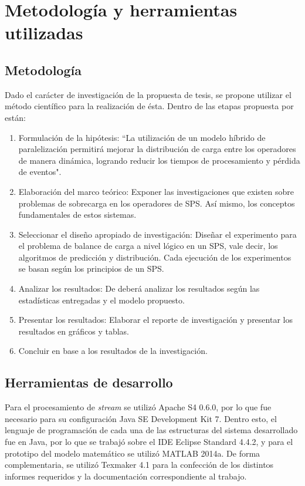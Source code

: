 \section{Metodología y herramientas utilizadas}
\label{intro:metodologia}

\subsection{Metodología}
Dado el carácter de investigación de la propuesta de tesis, se propone utilizar el método científico para la realización de ésta. Dentro de las etapas propuesta por \citep{hernandez2010metodologia} están:

\begin{enumerate}
	\item Formulación de la hipótesis: ``La utilización de un modelo híbrido de paralelización permitirá mejorar la distribución de carga entre los operadores de manera dinámica, logrando reducir los tiempos de procesamiento y pérdida de eventos".
	\item Elaboración del marco teórico: Exponer las investigaciones que existen sobre problemas de sobrecarga en los operadores de SPS. Así mismo, los conceptos fundamentales de estos sistemas.
	\item Seleccionar el diseño apropiado de investigación: Diseñar el experimento para el problema de balance de carga a nivel lógico en un SPS, vale decir, los algoritmos de predicción y distribución. Cada ejecución de los experimentos se basan según los principios de un SPS.
	\item Analizar los resultados: De deberá analizar los resultados según las estadísticas entregadas y el modelo propuesto.
	\item Presentar los resultados: Elaborar el reporte de investigación y presentar los resultados en gráficos y tablas.
	\item Concluir en base a los resultados de la investigación.
\end{enumerate}

\subsection{Herramientas de desarrollo}
Para el procesamiento de \textit{stream} se utilizó Apache S4 0.6.0, por lo que fue necesario para su configuración Java SE Development Kit 7. Dentro esto, el lenguaje de programación de cada una de las estructuras del sistema desarrollado fue en Java, por lo que se trabajó sobre el IDE Eclipse Standard 4.4.2, y para el prototipo del modelo matemático se utilizó MATLAB 2014a. De forma complementaria, se utilizó Texmaker 4.1 para la confección de los distintos informes requeridos y la documentación correspondiente al trabajo.

